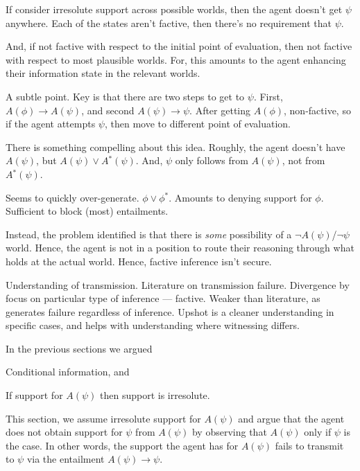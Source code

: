 \documentclass[10pt]{article}
\newcommand{\nf}[1]{#1\ensuremath{^{{*}}}}
\begin{document}
\begin{note}
  If consider irresolute support across possible worlds, then the agent doesn't get \(\psi\) anywhere.
  Each of the states aren't factive, then there's no requirement that \(\psi\).

  And, if not factive with respect to the initial point of evaluation, then not factive with respect to most plausible worlds.
  For, this amounts to the agent enhancing their information state in the relevant worlds.

  A subtle point.
  Key is that there are two steps to get to \(\psi\).
  First, \(A(\phi) \rightarrow A(\psi)\), and second \(A(\psi) \rightarrow \psi\).
  After getting \(A(\phi)\), non-factive, so if the agent attempts \(\psi\), then move to different point of evaluation.

  There is something compelling about this idea.
  Roughly, the agent doesn't have \(A(\psi)\), but \(A(\psi) \lor \nf{A}(\psi)\).
  And, \(\psi\) only follows from \(A(\psi)\), not from \(\nf{A}(\psi)\).

  Seems to quickly over-generate.
  \(\phi \lor \nf{\phi}\).
  Amounts to denying support for \(\phi\).
  Sufficient to block (most) entailments.

  Instead, the problem identified is that there is \emph{some} possibility of a \(\lnot A(\psi)\)/\(\lnot\psi\) world.
  Hence, the agent is not in a position to route their reasoning through what holds at the actual world.
  Hence, factive inference isn't secure.
\end{note}

\newpage

\begin{note}[Outline]
  Understanding of transmission.
  Literature on transmission failure.
  Divergence by focus on particular type of inference --- factive.
  Weaker than literature, as generates failure regardless of inference.
  Upshot is a cleaner understanding in specific cases, and helps with understanding where witnessing differs.

  In the previous sections we argued
  \begin{enumerate*}
  \item Conditional information, and
  \item If support for \(A(\psi)\) then support is irresolute.
  \end{enumerate*}
  This section, we assume irresolute support for \(A(\psi)\) and argue that the agent does not obtain support for \(\psi\) from \(A(\psi)\) by observing that \(A(\psi)\) only if \(\psi\) is the case.
  In other words, the support the agent has for \(A(\psi)\) fails to transmit to \(\psi\) via the entailment \(A(\psi) \rightarrow \psi\).
\end{note}
\end{document}
